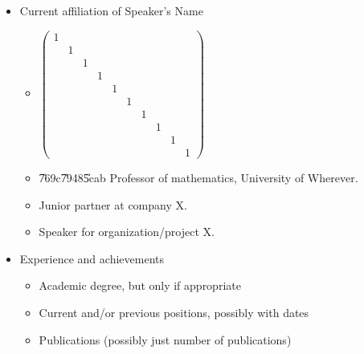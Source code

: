 \documentclass{article}
\begin{document}

\begin{itemize}
\item Current affiliation of Speaker's Name


\begin{itemize}
\item $\left( 
\begin{array}{cccccccccc}
1 &  &  &  &  &  &  &  &  &  \\ 
& 1 &  &  &  &  &  &  &  &  \\ 
&  & 1 &  &  &  &  &  &  &  \\ 
&  &  & 1 &  &  &  &  &  &  \\ 
&  &  &  & 1 &  &  &  &  &  \\ 
&  &  &  &  & 1 &  &  &  &  \\ 
&  &  &  &  &  & 1 &  &  &  \\ 
&  &  &  &  &  &  & 1 &  &  \\ 
&  &  &  &  &  &  &  & 1 &  \\ 
&  &  &  &  &  &  &  &  & 1%
\end{array}%
\right) $

\item \U{769c}\U{7948}\U{5cab} Professor of mathematics, University of
Wherever. 

\item Junior partner at company X. 

\item Speaker for organization/project X. 
\end{itemize}

\item Experience and achievements  


\begin{itemize}
\item Academic degree, but only if appropriate 

\item Current and/or previous positions, possibly with dates 

\item Publications (possibly just number of publications) 


\end{itemize}
\end{itemize}
\end{document}
